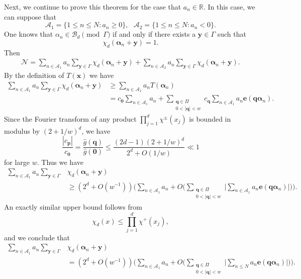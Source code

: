 \documentclass[12pt, reqno, twoside, letterpaper]{amsart}
\numberwithin{equation}{section}
\newcommand{\cB}{\ensuremath{\mathcal{B}}}
\theoremstyle{customthm}
\theoremstyle{customrem}
\begin{document}
Next, we continue to prove this theorem for the case that $a_n\in\mathbb{R}$.
In this case, we can suppose that
$$
\mathcal{A}_1=\{1\leqslant n\leqslant N: a_n\geqslant 0\},\ \ \
\mathcal{A}_2=\{1\leqslant n\leqslant N: a_n<0\}.
$$
One knows that $\alpha_n \in \cB_d \pmod{\Gamma}$ if and only if there exists a
$\boldsymbol{y} \in \Gamma$ such that
$$
\chi_d(\boldsymbol{\alpha}_n + \boldsymbol{y}) = 1.
$$
Then
\begin{align}\label{eq: A1+A2}
	\mathcal{N}=\sum_{n\in\mathcal{A}_1}a_n\sum_{\boldsymbol{y}\in\Gamma}
	\chi_d(\boldsymbol{\alpha}_n+\boldsymbol{y})
	+\sum_{n\in\mathcal{A}_2}a_n\sum_{\boldsymbol{y}\in\Gamma}
	\chi_d(\boldsymbol{\alpha}_n+\boldsymbol{y}).
\end{align}
By the definition of $T(\boldsymbol{x})$ we have
\begin{align*}
	\sum_{n\in\mathcal{A}_1}a_n\sum_{\boldsymbol{y}\in\Gamma}
	\chi_d(\boldsymbol{\alpha}_n+\boldsymbol{y})
	&\geqslant \sum_{n\in\mathcal{A}_1}a_n T(\boldsymbol{\alpha}_n)\\
	&=c_{\boldsymbol{0}} \sum_{n\in\mathcal{A}_1} a_n+
	\sum_{\substack{\boldsymbol{q}\in\Pi \\ 0<|\boldsymbol{q}|<w}} c_{\boldsymbol{q}}
	\sum_{n\in\mathcal{A}_1}a_n \mathbf{e}(\boldsymbol{q}\boldsymbol{\alpha}_n).
\end{align*}
Since the Fourier transform of any product $\prod_{j=1}^d \chi^{\pm}(x_j)$ is bounded in modulus by $(2+1/w)^d$, we have
$$
\frac{|c_{\boldsymbol{p}}|}{c_{\boldsymbol{0}}}
= \frac{\hat{g}(\boldsymbol{q})}{\hat{g}(\boldsymbol{0})}
\leqslant \frac{(2d-1)(2+1/w)^d}{2^d+O(1/w)} \ll 1
$$
for large $w$. Thus we have
\begin{align*}
	\sum_{n\in\mathcal{A}_1}a_n\sum_{\boldsymbol{y}\in\Gamma}
	&\chi_d(\boldsymbol{\alpha}_n+\boldsymbol{y})\\
	&\geqslant  (2^d + O(w^{-1})) \bigg( \sum_{n\in\mathcal{A}_1} a_n
	+ O\Bigg( \sum_{\substack{\boldsymbol{q}\in\Pi \\ 0<|\boldsymbol{q}|<w}}
	\Bigg| \sum_{n\in\mathcal{A}_1}a_n \mathbf{e}(\boldsymbol{q} \boldsymbol{\alpha}_n) \bigg| \Bigg) \Bigg).
\end{align*}
An exactly similar upper bound follows from
$$
\chi_d(x) \leqslant \prod_{j=1}^d \chi^+(x_j),
$$
and we conclude that
\begin{align*}
	\sum_{n\in\mathcal{A}_1}a_n\sum_{\boldsymbol{y}\in\Gamma}
	&\chi_d(\boldsymbol{\alpha}_n+\boldsymbol{y})\\
	&=(2^d + O(w^{-1})) \bigg( \sum_{n\in\mathcal{A}_1} a_n
	+ O\Bigg( \sum_{\substack{\boldsymbol{q}\in\Pi \\ 0<|\boldsymbol{q}|<w}}
	\Bigg| \sum_{n\leqslant N}a_n \mathbf{e}(\boldsymbol{q} \boldsymbol{\alpha}_n) \bigg| \Bigg) \Bigg).
\end{align*}
\end{document}
